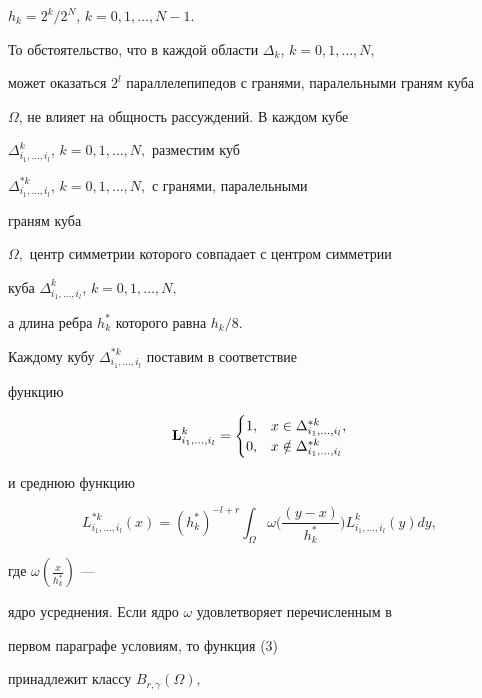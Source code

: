 $h_k=2^k/2^N$, $k=0,1,\dotsc,N-1.$


То обстоятельство, что в каждой области $\Delta_k$, $k=0,1,\dotsc,N,$


может оказаться $2^l$ параллелепипедов с гранями, паралельными граням куба


$\Omega$, не влияет на общность рассуждений. В каждом кубе


$\Delta_{i_1,\dotsc,i_l}^k$, $k=0,1,\dotsc,N,$ разместим куб


$\Delta_{i_1,\dotsc,i_l}^{*k}$, $k=0,1,\dotsc,N,$ с гранями, паралельными


граням куба


$\Omega,$ центр симметрии которого совпадает с центром симметрии


куба $\Delta_{i_1,\dotsc,i_l}^k$, $k=0,1,\dotsc,N,$


а длина ребра $h^*_k$ которого равна $h_k/8.$





Каждому кубу $\Delta^{*k}_{i_1,\dotsc,i_l} $ поставим в соответствие


функцию


$$


{\bold L^k_{i_1,\dotsc,i_l}}=


\begin{cases}


1, & x\in\Delta^{*k}_{i_1,\dotsc,i_l},\\


0, & x\notin\Delta^{*k}_{i_1,\dotsc,i_l}\\


\end{cases}


$$


и среднюю функцию


\begin{equation}


L^{*k}_{i_1,\dotsc,i_l}(x)=(h_k^*)^{-l+r}


\int_\Omega \omega \bigg(\frac{(y-x)}{h_k^*}\bigg)


L^{k}_{i_1,\dotsc,i_l}(y) dy,


\end{equation}


где $\omega(\frac{x}{h_k^*})$ ---


ядро усреднения. Если ядро $\omega$ удовлетворяет перечисленным в


первом параграфе условиям, то функция (3)


принадлежит классу $B_{r,\gamma}(\Omega),$


